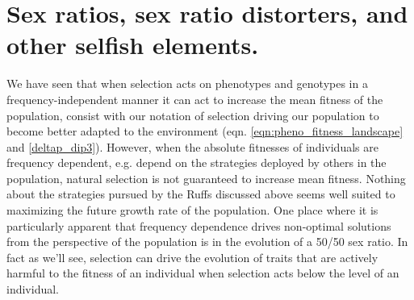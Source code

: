 {\section{Sex ratios, sex ratio distorters, and other selfish
  elements. } \label{section:sex_ratios}

We have seen that when selection acts on phenotypes and genotypes in a
frequency-independent manner it can act to
increase the mean fitness of the population, consist with our
notation of selection driving our population to become better adapted
to the environment (eqn. \eqref{eqn:pheno_fitness_landscape} and \eqref{deltap_dip3}). However, when the
absolute fitnesses of individuals are frequency dependent, e.g. depend
on the strategies deployed by others in the population, natural
selection is not guaranteed to increase mean fitness. Nothing about
the strategies pursued by the Ruffs discussed above seems well suited to
maximizing the future growth rate of the population. 
One place where it is particularly apparent that frequency dependence
drives non-optimal solutions from the perspective of the population is in the evolution of a 50/50 sex
ratio. In fact as we'll see, selection can drive the evolution of
traits that are actively harmful to the fitness of an individual when
selection acts below the level of an individual. 




}
